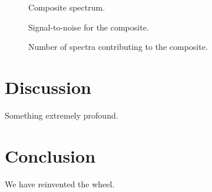 \documentclass[iop]{emulateapj}
\begin{document}
 \begin{figure*}
 \caption{Composite spectrum.\label{composite}}
 \end{figure*}

 \begin{figure}
 \caption{Signal-to-noise for the composite.\label{sn}}
 \end{figure}

 \begin{figure}
 \caption{Number of spectra contributing to the composite.\label{number}}
 \end{figure}

\section{Discussion}
Something extremely profound.
\section{Conclusion}
We have reinvented the wheel.

%
%
%
%

\end{document}
